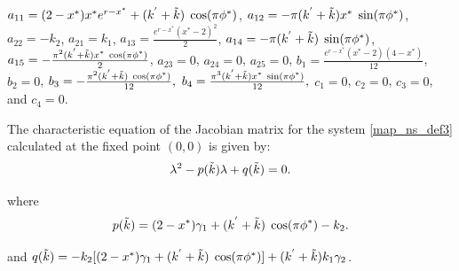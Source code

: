 \documentclass{article}
\begin{document}
\vspace{0.2cm}
$a_{11}=(2-x^*)x^{*}e^{r-x^*}+(k^{'}+\Tilde{k})\;\cos(\pi\phi^*)$, \hspace{0.3cm} \hspace{0.3cm} $a_{12}=-\pi(k^{'}+\Tilde{k})x^{*}\;\sin(\pi\phi^*)$, \hspace{0.3cm} \hspace{0.3cm}  $a_{22}=-k_2$, \hspace{0.3cm}  $a_{21}=k_1$, \hspace{0.3cm}  $a_{13}=\frac{e^{r-x^*}(x^*-2)^2}{2}$,  \hspace{0.3cm} $a_{14}=-\pi(k^{'}+\Tilde{k})\;\sin(\pi\phi^*)$, \hspace{0.3cm} $a_{15}=-\frac{\pi^{2}(k^{'}+\Tilde{k})x^{*}\;\cos(\pi\phi^*)}{2}$, \hspace{0.3cm}    $a_{23}=0$, \hspace{0.3cm} $a_{24}=0$, \hspace{0.3cm} $a_{25}=0$,\hspace{0.3cm}
$b_{1}=\frac{e^{r-x^*}(x^*-2)(4-x^*)}{12}$,\hspace{0.3cm}
$b_{2}=0$, \hspace{0.3cm}
$b_3=-\frac{\pi^2(k^{'}+\Tilde{k})\;\cos(\pi\phi^*)}{12},$  \hspace{0.3cm}          $b_4=\frac{\pi^3(k^{'}+\Tilde{k})x^{*}\;\sin(\pi\phi^*)}{12},$\hspace{0.3cm}
$c_1=0$, \hspace{0.2cm} $c_2=0$,\hspace{0.2cm} $c_3=0$,\hspace{0.2cm} and\hspace{0.2cm} $c_4=0.$

\noindent The characteristic equation of the Jacobian matrix for the system \eqref{map_ns_def3} calculated at the fixed point $(0,0)$ is given by:
\begin{equation}\label{char_for_k'}
    \lambda^2-p(\Tilde{k})\lambda+q(\Tilde{k})=0.
\end{equation}

\noindent where 
\begin{equation}
    p(\Tilde{k})=(2-x^*)\gamma_1+(k^{'}+\Tilde{k})\;\cos(\pi\phi^*)-k_2.\label{(p(x))}
\end{equation}

\noindent and 
\hspace{1.8cm} $q(\Tilde{k})=-k_2[(2-x^*)\gamma_1+(k^{'}+\Tilde{k})\;\cos(\pi\phi^*)]+(k^{'}+\Tilde{k})k_{1}\gamma_2$.
\end{document}
